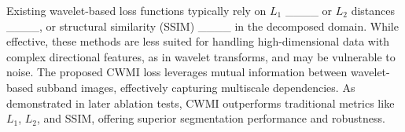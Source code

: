 Existing wavelet-based loss functions typically rely on $L_1$ ____ or $L_2$ distances ____, or structural similarity (SSIM) ____ in the decomposed domain. While effective, these methods are less suited for handling high-dimensional data with complex directional features, as in wavelet transforms, and may be vulnerable to noise. The proposed CWMI loss leverages mutual information between wavelet-based subband images, effectively capturing multiscale dependencies. As demonstrated in later ablation tests, CWMI outperforms traditional metrics like $L_1$, $L_2$, and SSIM, offering superior segmentation performance and robustness.